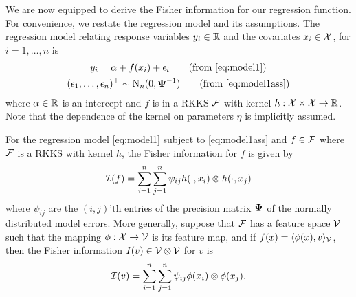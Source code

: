 We are now equipped to derive the Fisher information for our regression function.
For convenience, we restate the regression model and its assumptions.
The regression model relating response variables $y_i \in \mathbb{R}$ and the covariates $x_i \in {\mathcal X} $, for $i=1,\dots,n$ is
\begin{gather}
  y_i = \alpha + f(x_i) + \epsilon_i \retag{eq:model1} \\
  (\epsilon_1, \dots, \epsilon_n)^\top \sim \N_n(0, \bPsi^{-1}) \retag{eq:model1ass}
\end{gather}
where $\alpha \in \mathbb{R}$ is an intercept and $f$ is in a RKKS ${\mathcal F}$ with kernel $h:{\mathcal X} \times {\mathcal X} \to \mathbb{R}$.
Note that the dependence of the kernel on parameters $\eta$ is implicitly assumed.

\begin{lemma}\label{thm:fisherregf}
  For the regression model \cref{eq:model1} subject to \cref{eq:model1ass} and $f \in {\mathcal F}$ where ${\mathcal F}$ is a RKKS with kernel $h$, the Fisher information for $f$ is given by
  \[
    {\mathcal I}(f) = \sum_{i=1}^n\sum_{j=1}^n \psi_{ij} h(\cdot,x_i) \otimes h(\cdot,x_j)
  \]
  where $\psi_{ij}$ are the $(i,j)$'th entries of the precision matrix ${\bm\Psi}$ of the normally distributed model errors.
  More generally, suppose that ${\mathcal F}$ has a feature space ${\mathcal V}$ such that the mapping $\phi:{\mathcal X} \to {\mathcal V}$ is its feature map, and if $f(x)=\langle\phi(x),v\rangle_{\mathcal V}$, then the Fisher information $I(v) \in {\mathcal V} \otimes {\mathcal V}$ for $v$ is
  \[
    {\mathcal I}(v) = \sum_{i=1}^n\sum_{j=1}^n \psi_{ij} \phi(x_i) \otimes \phi(x_j).
  \]
\end{lemma}

